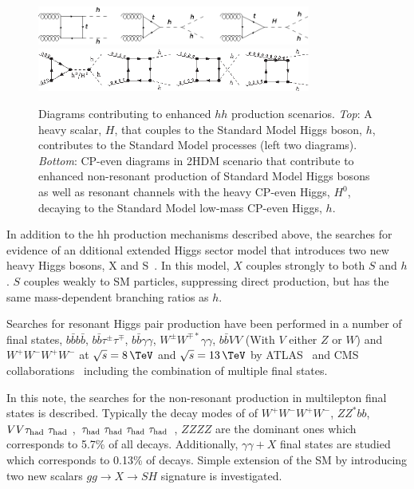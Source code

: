 \begin{figure}[!htb]
    \centering
    \includegraphics[width=0.8\textwidth]{figures/mg5_hh_heavy_scalar.png}
    \includegraphics[width=0.8\textwidth]{figures/mg5_hh_2hdm_cp_even.png}
    \caption
    {
        Diagrams contributing to enhanced $hh$ production scenarios.
        \textit{Top}: A heavy scalar, $H$, that couples to the Standard Model Higgs
        boson, $h$, contributes to the Standard Model processes (left two diagrams).
        \textit{Bottom}: CP-even diagrams in 2HDM scenario that contribute to enhanced
        non-resonant production of Standard Model Higgs bosons as well as resonant
        channels with the heavy CP-even Higgs, $H^0$, decaying to the Standard Model
        low-mass CP-even Higgs, $h$.
    }
    \label{fig:2hdm_feynman_diagrams}
\end{figure}


In addition to the hh production mechanisms described above, the searches for evidence of an dditional extended Higgs sector model that introduces two new heavy Higgs bosons, X and S~\cite{vonBuddenbrock:2016rmr}. In this model, $X$ couples strongly to both $S$ and $h$. $S$ couples weakly to SM particles, suppressing direct production, but has the same mass-dependent branching ratios as $h$. 

Searches for resonant Higgs pair production have been performed in a number of final states, $b\bar{b}b\bar{b}$, $b\bar{b}\tau^{\pm}\tau^{\mp}$, $b\bar{b}\gamma\gamma$, $W^{\pm}W^{\mp *}\gamma\gamma$, $b\bar{b}VV$ (With $V$ either $Z$ or $W$) and $W^+W^-W^+W^-$ at $\sqrt{s}=8\,\TeV$ and $\sqrt{s}=13\,\TeV$ by ATLAS~\cite{HIGG-2013-33,Aad:2019uzh} and CMS collaborations~\cite{CMS-HIG-13-032,CMS-HIG-15-013,PhysRevLett.122.121803} including the combination of multiple final states. 

In this note, the searches for the \dihiggs non-resonant production in multilepton final states is described. Typically the decay modes of \dihiggs of $W^+W^-W^+W^-$, $ZZ^*bb$, $VV\tauh\tauh$, $\tauh\tauh\tauh\tauh$, $ZZZZ$ are the dominant ones which corresponds to 5.7\% of all \dihiggs decays. Additionally, $\gamma\gamma + X$ final states are studied which corresponds to 0.13\% of \dihiggs decays. Simple extension of the SM by introducing two new scalars $gg \rightarrow X \rightarrow SH$ signature is investigated.


